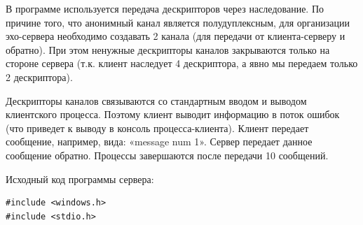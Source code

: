 \documentclass[a4paper]{article}
\begin{document}
	В программе используется передача дескрипторов через наследование. По причине того, что анонимный канал является полудуплексным, для организации эхо-сервера необходимо создавать 2 канала (для передачи от клиента-серверу и обратно). При этом ненужные дескрипторы каналов закрываются только на стороне сервера (т.к. клиент наследует 4 дескриптора, а явно мы передаем только 2 дескриптора).
	
	Дескрипторы каналов связываются со стандартным вводом и выводом клиентского процесса. Поэтому клиент выводит информацию в поток ошибок (что приведет к выводу в консоль процесса-клиента).
Клиент передает сообщение, например, вида: «message num 1». Сервер передает данное сообщение обратно. Процессы завершаются после передачи 10 сообщений.

	Исходный код программы сервера:
	\begin{lstlisting}[style=crs_cpp]
#include <windows.h>
#include <stdio.h>


\end{lstlisting}
\end{document}
